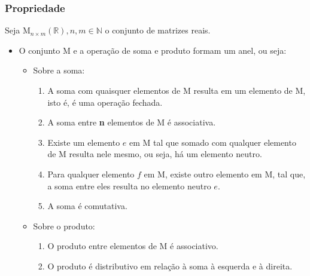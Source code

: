\documentclass[a4paper,12pt]{article}
\begin{document}
\subsubsection{Propriedade}

Seja $ \text{M}_{n \times m} (\mathbb{R}), n,m \in \mathbb{N} $ o conjunto de matrizes reais.

\begin{itemize}
    \item O conjunto M e a operação de soma e produto formam um anel, ou seja:
    
    \begin{itemize}
    
        \item Sobre a soma:

        \begin{enumerate}
        
            \item A soma com quaisquer elementos de M resulta em um elemento de M, isto é, é uma operação fechada.
            
            \item A soma entre \textbf{n} elementos de M é associativa.
            
            \item Existe um elemento $ e $ em M tal que somado com qualquer elemento de M resulta nele mesmo, ou seja, há um elemento neutro.
            
            \item Para qualquer elemento $ f $ em M, existe outro elemento em M, tal que, a soma entre eles resulta no elemento neutro $ e $.
            
            \item A soma é comutativa.
            
        \end{enumerate}

        \item Sobre o produto:
        
        \begin{enumerate}
        
            \item O produto entre elementos de M é associativo.
            
            \item O produto é distributivo em relação à soma à esquerda e à direita.
            
        \end{enumerate}
        
    \end{itemize}
    
\end{itemize}
\end{document}
